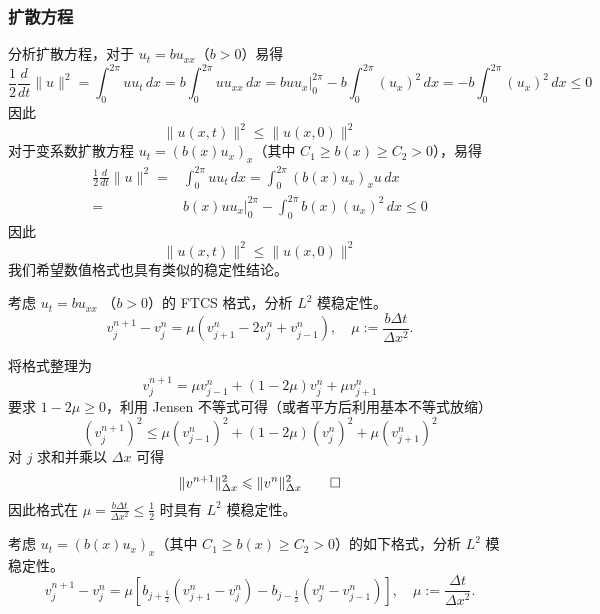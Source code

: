 \subsubsection{扩散方程}

分析扩散方程，对于 $u_t = b u_{xx}$（$b > 0$）易得
\[
    \frac12 \frac{d}{dt} \| u \|^2 = \int_{0}^{2\pi} u u_t \,dx = b \int_0^{2\pi} u u_{xx}\,dx
    = b u u_x \big|_0^{2\pi} - b \int_{0}^{2\pi} (u_x)^2\,dx = - b \int_{0}^{2\pi} (u_x)^2\,dx \le 0
\]
因此
\[
    \| u(x,t) \|^2 \le \| u(x,0) \|^2
\]
对于变系数扩散方程 $u_t = (b(x) u_x)_x$（其中 $C_1 \ge b(x) \ge C_2 > 0$），易得
\begin{align*}
    \frac12 \frac{d}{dt} \|u\|^2 ={} & \int_{0}^{2\pi} u u_t \,dx
    = \int_0^{2\pi} (b(x) u_x)_x u\,dx                                      \\
    ={}                              & \left. b(x) u u_x \right|_{0}^{2\pi}
    - \int_{0}^{2\pi} b(x) (u_x)^2\,dx \le 0
\end{align*}
因此
\[
    \| u(x,t) \|^2 \le \| u(x,0) \|^2
\]
我们希望数值格式也具有类似的稳定性结论。

\begin{example}
    考虑 $u_t = b u_{xx}$ （$b > 0$）的 FTCS 格式，分析 $L^2$ 模稳定性。
    \[
        v_j^{n+1} - v_j^n = \mu (v_{j+1}^n - 2v_j^n + v_{j-1}^n),\quad \mu := \frac{b \Delta t}{\Delta x^2}.
    \]
\end{example}

\begin{solution*}
    将格式整理为
    \[
        v_j^{n+1} = \mu v_{j-1}^n + (1-2\mu) v_j^n + \mu v_{j+1}^n
    \]
    要求 $1-2\mu \ge 0$，利用 Jensen 不等式可得（或者平方后利用基本不等式放缩）
    \[
        (v_j^{n+1})^2 \le \mu (v_{j-1}^n)^2 + (1-2\mu) (v_j^n)^2 + \mu (v_{j+1}^n)^2
    \]
    对 $j$ 求和并乘以 $\Delta x$ 可得
    \[
        \| v^{n+1} \|_{\Delta x}^2 \le \| v^{n} \|_{\Delta x}^2 \qedhere
    \]
    因此格式在 $\mu = \frac{b \Delta t}{\Delta x^2} \le \frac12$ 时具有 $L^2$ 模稳定性。
\end{solution*}

\begin{example}
    考虑 $u_t = (b(x) u_x)_x$（其中 $C_1 \ge b(x) \ge C_2 > 0$）的如下格式，分析 $L^2$ 模稳定性。
    \[
        v_j^{n+1}-v_j^n =
        \mu \left[ b_{j+\frac12} (v_{j+1}^n - v_j^{n})
        - b_{j-\frac12} (v_{j}^n - v_{j-1}^{n})\right]
        ,\quad \mu := \frac{\Delta t}{\Delta x^2}.
    \]
\end{example}


